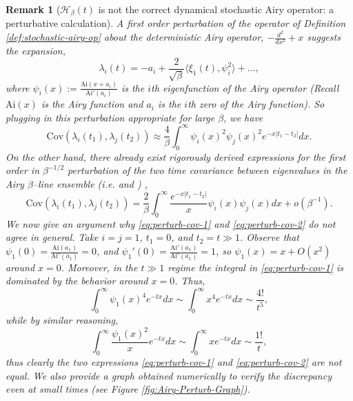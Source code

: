 \documentclass{amsart}
\newtheorem{rmk}[thm]{Remark}
\numberwithin{equation}{section}
\begin{document}
\begin{rmk}[$\mathcal{H}_{\beta}(t)$ is not the correct dynamical stochastic Airy operator: a perturbative calculation]
    A first order perturbation of the operator of Definition \ref{def:stochastic-airy-op} about the deterministic Airy operator, $-\frac{d^2}{dx^2}+x$ suggests the expansion,
    \begin{equation*}
    \lambda_i(t) = -a_i + \frac{2}{\sqrt{\beta}} \langle \xi_1(t),\psi_i^2 \rangle + \dots,
    \end{equation*}
    where $\psi_i(x):=\frac{\mathrm{Ai}(x+a_i)}{\mathrm{Ai'}(a_i)}$ is the $i$th eigenfunction of the Airy operator (Recall $\mathrm{Ai}(x)$ is the Airy function and $a_i$ is the $i$th zero of the Airy function). So plugging in this perturbation appropriate for large $\beta$, we have
    \begin{equation}\label{eq:perturb-cov-1}
        \mathrm{Cov}(\lambda_i(t_1),\lambda_j(t_2)) \approx \frac{4}{\beta} \int_0^{\infty} \psi_i(x)^2\psi_j(x)^2 e^{-x|t_1-t_2|} dx.
    \end{equation}
    On the other hand, there already exist rigorously derived expressions for the first order in $\beta^{-1/2}$ perturbation of the two time covariance between eigenvalues in the Airy $\beta$--line ensemble (i.e. \cite[Theorem 1.2]{GorinPerturbation} and \cite[Equation (126)]{PierrePerturbations})  ,
    \begin{equation}\label{eq:perturb-cov-2}
         \mathrm{Cov}(\lambda_i(t_1),\lambda_j(t_2)) = \frac{2}{\beta}\int_0^{\infty}   \frac{e^{- x|t_1-t_2|}}{x} \psi_i(x) \psi_j(x)dx+o(\beta^{-1}).
    \end{equation}
    We now give an argument why \eqref{eq:perturb-cov-1} and \eqref{eq:perturb-cov-2} do not agree in general. Take $i=j=1$, $t_1=0$, and $t_2=t \gg 1$. Observe that $\psi_1(0)=\frac{\mathrm{Ai}(a_1)}{\mathrm{Ai}'(a_1)}=0$, and $\psi_1'(0)=\frac{\mathrm{Ai}'(a_1)}{\mathrm{Ai}'(a_1)}=1$, so $\psi_1(x) =x+O(x^2)$ around $x=0$. Moreover, in the $t \gg 1$ regime the integral in \eqref{eq:perturb-cov-1} is dominated by the behavior around $x=0$. Thus,
    \begin{equation*}
        \int_0^{\infty} \psi_1(x)^4 e^{-tx}dx \sim \int_0^{\infty} x^4 e^{-tx}dx \sim \frac{4!}{t^5},
    \end{equation*}
    while by similar reasoning,
    \begin{equation*}
        \int_0^{\infty} \frac{\psi_1(x)^2}{x} e^{-tx}dx \sim \int_0^{\infty} x e^{-tx}dx \sim \frac{1!}{t},
    \end{equation*}
    thus clearly the two expressions \eqref{eq:perturb-cov-1} and \eqref{eq:perturb-cov-2} are not equal. We also provide a graph obtained numerically to verify the discrepancy even at small times (see Figure \ref{fig:Airy-Perturb-Graph}).
\end{rmk}
\end{document}
